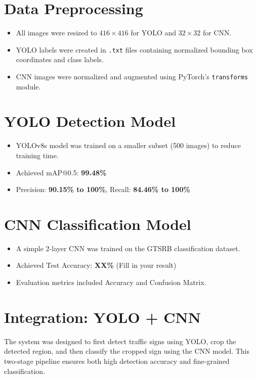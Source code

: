\documentclass[12pt]{article}
\begin{document}
\section{Data Preprocessing}
\begin{itemize}
    \item All images were resized to $416 \times 416$ for YOLO and $32 \times 32$ for CNN.
    \item YOLO labels were created in \texttt{.txt} files containing normalized bounding box coordinates and class labels.
    \item CNN images were normalized and augmented using PyTorch's \texttt{transforms} module.
\end{itemize}

\section{YOLO Detection Model}
\begin{itemize}
    \item YOLOv8s model was trained on a smaller subset (500 images) to reduce training time.
    \item Achieved mAP@0.5: \textbf{99.48\%}
    \item Precision: \textbf{90.15\% to 100\%}, Recall: \textbf{84.46\% to 100\%}
\end{itemize}


\section{CNN Classification Model}
\begin{itemize}
    \item A simple 2-layer CNN was trained on the GTSRB classification dataset.
    \item Achieved Test Accuracy: \textbf{XX\%} (Fill in your result)
    \item Evaluation metrics included Accuracy and Confusion Matrix.
\end{itemize}



\section{Integration: YOLO + CNN}
The system was designed to first detect traffic signs using YOLO, crop the detected region, and then classify the cropped sign using the CNN model. This two-stage pipeline ensures both high detection accuracy and fine-grained classification.
\end{document}
